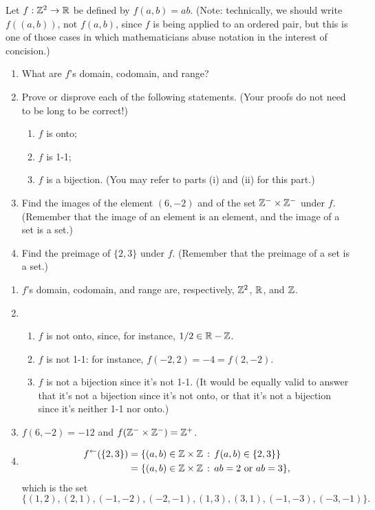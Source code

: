 \begin{exercise}[ID=1D]
Let $f: \mathbb{Z}^2 \to \mathbb{R}$ be defined by $f(a,b)=ab$.  (Note: technically, we should write $f((a,b))$, not $f(a,b)$, since $f$ is being applied to an ordered pair, but this is one of those cases in which mathematicians abuse notation in the interest of concision.)

\begin{enumerate}
\item What are $f$'s domain, codomain, and range?
\item Prove or disprove each of the following statements. (Your proofs do not need to be long to be correct!)
\begin{enumerate}
\item $f$ is onto;
\item $f$ is 1-1;
\item $f$ is a bijection. (You may refer to parts (i) and (ii) for this part.)
\end{enumerate}

\item Find the images of the element $(6,-2)$ and of the set $\mathbb{Z}^- \times \mathbb{Z}^-$ under $f$. (Remember that the image of an element is an element, and the image of a set is a set.)
\item Find the preimage of $\{2,3\}$ under $f$. (Remember that the preimage of a set is a set.)
\end{enumerate}

\end{exercise}

\begin{solution}[print=true]

\begin{enumerate}
\item $f$'s domain, codomain, and range are, respectively, $\mathbb{Z}^2$, $\mathbb{R}$, and $\mathbb{Z}$.

\item
\begin{enumerate}
\item $f$ is not onto, since, for instance, $1/2\in \mathbb{R}-\mathbb{Z}$.
\item $f$ is not 1-1: for instance, $f(-2,2)=-4=f(2,-2)$.
\item $f$ is not a bijection since it's not 1-1. (It would be equally valid to answer that it's not a bijection since it's not onto, or that it's not a bijection since it's neither 1-1 nor onto.)
\end{enumerate}

\item $f(6,-2)=-12$ and $f(\mathbb{Z}^-\times \mathbb{Z}^-)=\mathbb{Z}^+$.

\item
\begin{align*}
f^{\leftarrow}(\{2,3\})&=\{(a,b)\in \mathbb{Z}\times \mathbb{Z}\,:\, f(a,b)\in \{2,3\}\}\\
&=\{(a,b)\in \mathbb{Z}\times \mathbb{Z}\,:\, ab=2 \mbox{ or } ab=3\},
\end{align*}
which is the set
$$\{(1,2),(2,1),(-1,-2),(-2,-1),(1,3),(3,1),(-1,-3),(-3,-1)\}.$$
\end{enumerate}

\end{solution}

